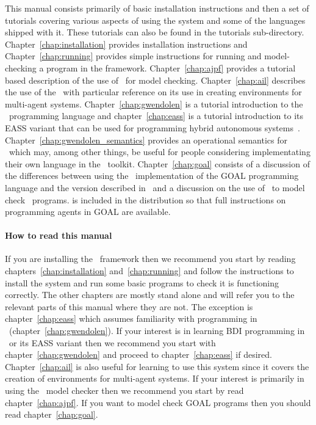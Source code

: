 This manual consists primarily of basic installation instructions and then a set of tutorials covering various aspects of using the system and some of the languages shipped with it.  These tutorials can also be found in the tutorials sub-directory.  Chapter~\ref{chap:installation} provides installation instructions and Chapter~\ref{chap:running} provides simple instructions for running and model-checking a program in the framework.  Chapter~\ref{chap:ajpf} provides a tutorial based description of the use of \ajpf\ for model checking.  Chapter~\ref{chap:ail} describes the use of the \ail\ with particular reference on its use in creating environments for multi-agent systems.  Chapter~\ref{chap:gwendolen} is a tutorial introduction to the \gwendolen\ programming language and chapter~\ref{chap:eass} is a tutorial introduction to its EASS variant that can be used for programming hybrid autonomous systems~.  Chapter~\ref{chap:gwendolen_semantics} provides an operational semantics for \gwendolen\ which may, among other things, be useful for people considering implementating their own language in the \ail\ toolkit.  Chapter~\ref{chap:goal} consists of a discussion of the differences between using the \ail\ implementation of the GOAL programming language and the version described in~\cite{goalmanual} and a discussion on the use of \ajpf\ to model check \goal\ programs.  \cite{goalmanual} is included in the distribution so that full instructions on programming agents in GOAL are available.

\paragraph{How to read this manual}  If you are installing the \mcapl\ framework then we recommend you start by reading chapters~\ref{chap:installation} and~\ref{chap:running} and follow the instructions to install the system and run some basic programs to check it is functioning correctly.  The other chapters are mostly stand alone and will refer you to the relevant parts of this manual where they are not.  The exception is chapter~\ref{chap:eass} which assumes familiarity with programming in \gwendolen\ (chapter~\ref{chap:gwendolen}).  If your interest is in learning BDI programming in \gwendolen\ or its EASS variant then we recommend you start with chapter~\ref{chap:gwendolen} and proceed to chapter~\ref{chap:eass} if desired.  Chapter~\ref{chap:ail} is also useful for learning to use this system since it covers the creation of environments for multi-agent systems.  If your interest is primarily in using the \ajpf\ model checker then we recommend you start by read chapter~\ref{chap:ajpf}.  If you want to model check GOAL programs then you should read chapter~\ref{chap:goal}.

